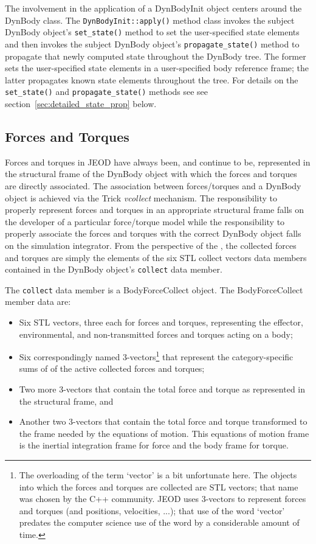 The \ModelDesc involvement in the application of a DynBodyInit object
centers around the DynBody class.
The \verb+DynBodyInit::apply()+ method class invokes the subject
DynBody object's \verb+set_state()+ method to set the user-specified state
elements and then invokes the subject DynBody object's \verb+propagate_state()+
method to propagate that newly computed state throughout the DynBody tree. The former
sets the user-specified state elements in a user-specified body reference frame; the latter propagates known state elements throughout the tree.
For details on the \verb+set_state()+ and \verb+propagate_state()+ methods see
see section~\ref{sec:detailed_state_prop} below.

\subsection{Forces and Torques}\label{sec:detailed_force_torque}
Forces and torques in JEOD have always been, and continue to be, represented in the
structural frame of the DynBody object with which the forces and torques are
directly associated. The association between forces/torques and a DynBody
object is achieved via the Trick \emph{vcollect} mechanism. The responsibility
to properly represent forces and torques in an appropriate structural frame
falls on the developer of a particular force/torque model while the
responsibility to properly associate the forces and torques with the correct
DynBody object falls on the simulation integrator.
From the perspective of the \ModelDesc, the collected forces and torques are
simply the elements of the six STL collect vectors data members contained in
the DynBody object's \verb+collect+ data member.

The \verb+collect+ data member is a BodyForceCollect object.
The BodyForceCollect member data are:\begin{itemize}
\item Six STL vectors, three each for forces and torques, representing the
  effector, environmental, and non-transmitted forces and torques
  acting on a body;
\item Six correspondingly named 3-vectors\footnote{The overloading of the term
  `vector' is a bit unfortunate here. The objects into which the forces
  and torques are collected are STL vectors; that name was chosen by the C++
  community. JEOD uses 3-vectors to represent forces and torques (and positions,
  velocities, ...); that use of the word `vector' predates the computer science
  use of the word by a considerable amount of time.} that represent the
  category-specific sums of of the active collected forces and torques;
\item Two more 3-vectors that contain the total force and torque as represented
  in the structural frame, and
\item Another two 3-vectors that contain the total force and torque
  transformed to the frame needed by the equations of motion.
  This equations of motion frame is the inertial integration frame for force
  and the body frame for torque.
\end{itemize}

